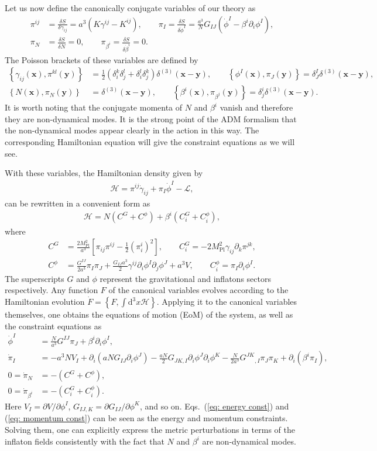 \documentclass[a4paper,11pt]{article}
\newcommand{\var}[2]{\frac{\delta #1}{\delta #2}}
\newcommand{\dd}{\mathrm{d}}
\newcommand{\Mpl}{M_\text{Pl}}
\newcommand{\Pbraket}[1]{\left\{ #1 \right\}}
\newcommand{\scrH}{\mathscr{H}}
\newcommand{\calL}{\mathcal{L}}
\newcommand{\bae}[1]{\begin{align} #1 \end{align}}
\begin{document}
Let us now define the canonically conjugate variables of our theory as
\bae{\label{eq: Legendre trs}
	\pi^{ij}&=\var{S}{\dot{\gamma}_{ij}}=a^3(K\gamma^{ij}-K^{ij}), \quad\quad
	\pi_I=\var{S}{\dot{\phi}^I}=\frac{a^3}{N}G_{IJ}(\dot{\phi}^I-\beta^i\partial_i\phi^I), \nonumber \\
	\pi_N&=\var{S}{\dot{N}}=0, \quad\quad
	\pi_{\beta^i}=\var{S}{\dot{\beta}^i}=0.
}
The Poisson brackets of these variables are defined by
\bae{
	\Pbraket{\gamma_{ij}(\mathbf{x}),\pi^{kl}(\mathbf{y})}
	&=\frac{1}{2}(\delta_i^k\delta_j^l+\delta_i^l\delta_j^k)\delta^{(3)}(\mathbf{x}-\mathbf{y}), \quad\quad
	\Pbraket{\phi^I(\mathbf{x}),\pi_J(\mathbf{y})}=\delta^I_J\delta^{(3)}(\mathbf{x}-\mathbf{y}), \nonumber \\
	\Pbraket{N(\mathbf{x}),\pi_N(\mathbf{y})}&=\delta^{(3)}(\mathbf{x}-\mathbf{y}), \quad\quad
	\Pbraket{\beta^i(\mathbf{x}),\pi_{\beta^j}(\mathbf{y})}=\delta^i_j\delta^{(3)}(\mathbf{x}-\mathbf{y}).
}
It is worth noting that the conjugate momenta of $N$ and $\beta^i$ vanish and therefore they are non-dynamical modes.
It is the strong point of the ADM formalism that the non-dynamical modes appear clearly in the action in this way.
The corresponding Hamiltonian equation will give the constraint equations as we will see.

With these variables, the Hamiltonian density given by
\bae{
	\scrH=\pi^{ij}\dot{\gamma}_{ij}+\pi_I\dot{\phi}^I-\calL,
}
can be rewritten in a convenient form as
\bae{\label{eq: Hamiltonian}
	\scrH=N(C^G+C^\phi)+\beta^i(C_i^G+C_i^\phi),
}
where
\bae{
	C^G&=\frac{2\Mpl^2}{a^3}\left[\pi_{ij}\pi^{ij}-\frac{1}{2}(\pi^i_i)^2\right], \quad\quad
	C^G_i=-2\Mpl^2\gamma_{ij}\partial_k\pi^{jk}, \nonumber \\
	C^\phi&=\frac{G^{IJ}}{2a^3}\pi_I\pi_J+\frac{G_{IJ}a^3}{2}\gamma^{ij}\partial_i\phi^I\partial_j\phi^J+a^3V, \quad\quad
	C^\phi_i=\pi_I\partial_i\phi^I.
}
The superscripts $G$ and $\phi$ represent the gravitational and inflatons sectors respectively.
Any function $F$ of the canonical variables evolves according to the Hamiltonian evolution $\dot{F}=\Pbraket{F,\int\dd^3x\scrH}$.
Applying it to the canonical variables themselves, one obtains the equations of motion (EoM) of the system, as well as the constraint equations as
\bae{
	\dot{\phi}^I&=\frac{N}{a^3}G^{IJ}\pi_J+\beta^i\partial_i\phi^I, \label{eq: phi EoM}\\
	\dot{\pi}_I&=-a^3NV_I+\partial_i\left(aNG_{IJ}\partial_i\phi^J\right)-\frac{aN}{2}G_{JK,I}\partial_i\phi^J\partial_i\phi^K
	-\frac{N}{2a^3}G^{JK}{}_{,I}\pi_J\pi_K+\partial_i(\beta^i\pi_I), \label{eq: pi EoM} \\
	0=\dot{\pi}_N&=-(C^G+C^\phi), \label{eq: energy const} \\
	0=\dot{\pi}_{\beta^i}&=-(C^G_i+C^\phi_i). \label{eq: momentum const}
}
Here $V_I=\partial V/\partial\phi^I$, $G_{IJ,K}=\partial G_{IJ}/\partial\phi^K$, and so on.
Eqs.~(\ref{eq: energy const}) and (\ref{eq: momentum const}) can be seen as the energy and momentum constraints.
Solving them, one can explicitly express the metric perturbations in terms of the inflaton fields consistently with the fact that $N$ and $\beta^i$
are non-dynamical modes.
\end{document}
